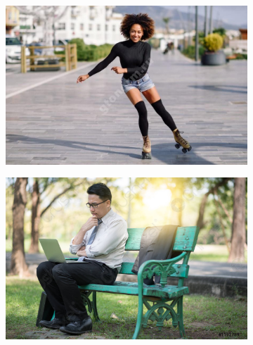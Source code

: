\begin{figure}[h]
\begin{subfigure}[b]{.5\textwidth}
	\centering
	\includegraphics[width=\textwidth]{./images/Test/ролики2}
	\caption{ }
\end{subfigure}
\begin{subfigure}[b]{.5\textwidth}
	\centering
    \includegraphics[width=\textwidth]{./images/Test/скамека3}
    \caption{ }
\end{subfigure}
\begin{subfigure}[b]{.5\textwidth}
	\centering

\end{subfigure}
\end{figure}
